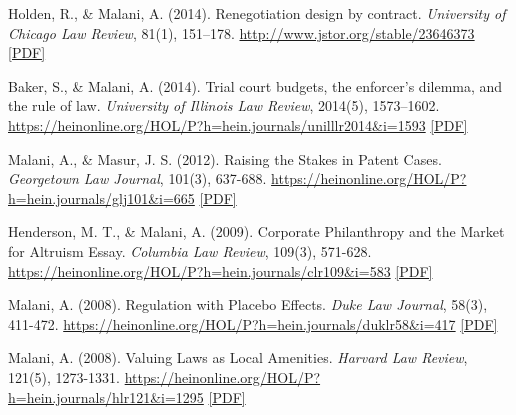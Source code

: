 \begin{tablist}
        \item[2014] \tab{}Holden, R., \& Malani, A. (2014). Renegotiation design by contract. \textit{University of Chicago Law Review}, 81(1), 151–178. \href{http://www.jstor.org/stable/23646373}{http://www.jstor.org/stable/23646373} \href{https://github.com/anup-malani/website_personal/blob/main/publications/2014_HoldenMalani_UCLR_Renegotiation.pdf}{[PDF]}
        
        \item[2014] \tab{}Baker, S., \& Malani, A. (2014). Trial court budgets, the enforcer's dilemma, and the rule of law. \textit{University of Illinois Law Review}, 2014(5), 1573–1602. \href{https://heinonline.org/HOL/P?h=hein.journals/unilllr2014&i=1593}{https://heinonline.org/HOL/P?h=hein.journals/unilllr2014\&i=1593} \href{https://github.com/anup-malani/website_personal/blob/main/publications/2014_BakerMalani_UIllLRev_EnforcersDilemma.pdf}{[PDF]}
        
        \item[2012] \tab{}Malani, A., \& Masur, J. S. (2012). Raising the Stakes in Patent Cases. \textit{Georgetown Law Journal}, 101(3), 637-688. \href{https://heinonline.org/HOL/P?h=hein.journals/glj101&i=665}{https://heinonline.org/HOL/P?h=hein.journals/glj101\&i=665} \href{https://github.com/anup-malani/website_personal/blob/main/publications/2012_MalaniMasur_PatentDamages.PDF}{[PDF]}

        \item[2009] \tab{}Henderson, M. T., \& Malani, A. (2009). Corporate Philanthropy and the Market for Altruism Essay. \textit{Columbia Law Review}, 109(3), 571-628. \href{https://heinonline.org/HOL/P?h=hein.journals/clr109&i=583}{https://heinonline.org/HOL/P?h=hein.journals/clr109\&i=583} \href{https://github.com/anup-malani/website_personal/blob/main/publications/2009_Henderson_Malani_CorporatePhilathropy.pdf}{[PDF]} 

        \item[2008] \tab{}Malani, A. (2008). Regulation with Placebo Effects. \textit{Duke Law Journal}, 58(3), 411-472. \href{https://heinonline.org/HOL/P?h=hein.journals/duklr58&i=417}{https://heinonline.org/HOL/P?h=hein.journals/duklr58\&i=417} \href{https://github.com/anup-malani/website_personal/blob/main/publications/2008_Malani_DukeLJ_RegulationPlaceboEffects.pdf}{[PDF]}

        \item[2008] \tab{}Malani, A. (2008). Valuing Laws as Local Amenities. \textit{Harvard Law Review}, 121(5), 1273-1331. \href{https://heinonline.org/HOL/P?h=hein.journals/hlr121&i=1295}{https://heinonline.org/HOL/P?h=hein.journals/hlr121\&i=1295}  \href{https://github.com/anup-malani/website_personal/blob/main/publications/2008_Malani_HarvLRev_LawAsLocalAmenity.pdf}{[PDF]} 


\end{tablist}
